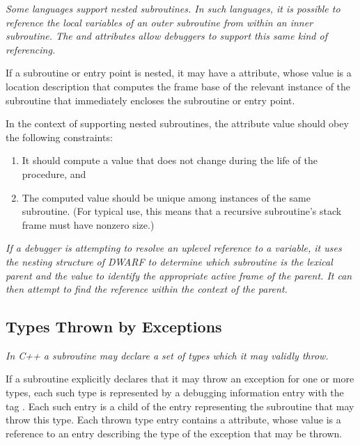 \textit{Some languages support nested subroutines. In such languages,
it is possible to reference the local variables of an
outer subroutine from within an inner subroutine. The
 and  attributes allow
debuggers to support this same kind of referencing.}

If a subroutine or entry point is nested, it may have a
 attribute, whose value is a location
description that computes the frame base of the relevant
instance of the subroutine that immediately encloses the
subroutine or entry point.

In the context of supporting nested subroutines, the
 attribute value should obey the following
constraints:

\begin{enumerate}[1.]
\item It should compute a value that does not change during the
life of the procedure, and

\item The computed value should be unique among instances of
the same subroutine. (For typical  use, this
means that a recursive subroutine’s stack frame must have
non\dash zero size.)
\end{enumerate}

\textit{If a debugger is attempting to resolve an up\dash level reference
to a variable, it uses the nesting structure of DWARF to
determine which subroutine is the lexical parent and the
 value to identify the appropriate active
frame of the parent. It can then attempt to find the reference
within the context of the parent.}



\subsection{Types Thrown by Exceptions}
\label{chap:typesthrownbyexceptions}

\textit{In C++ a subroutine may declare a set of types which
it may validly throw.}

If a subroutine explicitly declares that it may throw
an exception for one or more types, each such type is
represented by a debugging information entry with the tag
.  
Each such entry is a child of the entry
representing the subroutine that may throw this type. Each
thrown type entry contains a  attribute, whose
value is a reference to an entry describing the type of the
exception that may be thrown.

